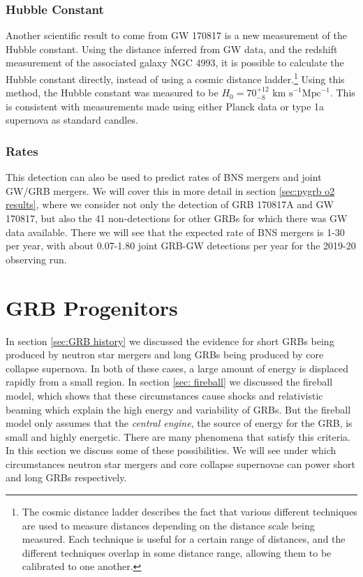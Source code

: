 \documentclass[11pt]{cuthesis}
\begin{document}
\subsubsection{Hubble Constant}
Another scientific result to come from GW 170817 is a new measurement of the Hubble constant. Using the distance inferred from GW data, and the redshift measurement of the associated galaxy NGC 4993, it is possible to calculate the Hubble constant directly, instead of using a cosmic distance ladder.\footnote{The cosmic distance ladder describes the fact that various different techniques are used to measure distances depending on the distance scale being measured. Each technique is useful for a certain range of distances, and the different techniques overlap in some distance range, allowing them to be calibrated to one another.} Using this method, the Hubble constant was measured to be $H_0 = 70^{+12}_{-8} \text{ km s}^{-1} \text{Mpc}^{-1}$. This is consistent with measurements made using either Planck data or type 1a supernova as standard candles.\cite{hubble_constant}

\subsubsection{Rates}
This detection can also be used to predict rates of BNS mergers and joint GW/GRB mergers. We will cover this in more detail in section \ref{sec:pygrb o2 results}, where we consider not only the detection of GRB 170817A and GW 170817, but also the 41 non-detections for other GRBs for which there was GW data available. There we will see that the expected rate of BNS mergers is 1-30 per year, with about 0.07-1.80 joint GRB-GW detections per year for the 2019-20 observing run.


\section{GRB Progenitors} \label{sec: grb prog}
In section \ref{sec:GRB history} we discussed the evidence for short GRBs being produced by neutron star mergers and long GRBs being produced by core collapse supernova. In both of these cases, a large amount of energy is displaced rapidly from a small region. In section \ref{sec: fireball} we discussed  the fireball model, which shows that these circumstances cause shocks and relativistic beaming which explain the high energy and variability of GRBs. But the fireball model only assumes that the \textit{central engine}, the source of energy for the GRB, is small and highly energetic. There are many phenomena that satisfy this criteria. In this section we discuss some of these possibilities. We will see under which circumstances neutron star mergers and core collapse supernovae can power short and long GRBs respectively.
\end{document}
